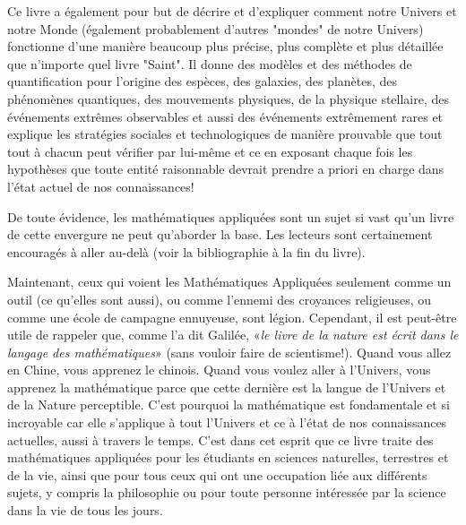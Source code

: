 	Ce livre a \'egalement pour but de d\'ecrire et d'expliquer comment notre Univers et notre Monde (\'egalement probablement d'autres "mondes" de notre Univers) fonctionne d'une manière beaucoup plus pr\'ecise, plus complète et plus d\'etaill\'ee que n'importe quel livre "Saint". Il donne des modèles et des m\'ethodes de quantification pour l'origine des espèces, des galaxies, des planètes, des ph\'enomènes quantiques, des mouvements physiques, de la physique stellaire, des \'ev\'enements extrêmes observables et aussi des \'ev\'enements extrêmement rares et explique les strat\'egies sociales et technologiques de manière prouvable que tout tout à chacun peut v\'erifier par lui-même et ce en exposant chaque fois les hypothèses que toute entit\'e raisonnable devrait prendre a priori en charge dans l'\'etat actuel de nos connaissances!
	
	De toute \'evidence, les math\'ematiques appliqu\'ees sont un sujet si vast qu'un livre de cette envergure ne peut qu'aborder la base. Les lecteurs sont certainement encourag\'es à aller au-delà (voir la bibliographie à la fin du livre).

	Maintenant, ceux qui voient les Math\'ematiques Appliqu\'ees seulement comme un outil (ce qu'elles sont aussi), ou comme l'ennemi des croyances religieuses, ou comme une \'ecole de campagne ennuyeuse, sont l\'egion. Cependant, il est peut-être utile de rappeler que, comme l'a dit Galil\'ee, «\textit{le livre de la nature est \'ecrit dans le langage des math\'ematiques}» (sans vouloir faire de scientisme!). Quand vous allez en Chine, vous apprenez le chinois. Quand vous voulez aller à l'Univers, vous apprenez la math\'ematique parce que cette dernière est la langue de l'Univers et de la Nature perceptible. C'est pourquoi la math\'ematique est fondamentale et si incroyable car elle s'applique à tout l'Univers et ce à l'\'etat de nos connaissances actuelles, aussi à travers le temps. C'est dans cet esprit que ce livre traite des math\'ematiques appliqu\'ees pour les \'etudiants en sciences naturelles, terrestres et de la vie, ainsi que pour tous ceux qui ont une occupation li\'ee aux diff\'erents sujets, y compris la philosophie ou pour toute personne int\'eress\'ee par la science dans la vie de tous les jours.

